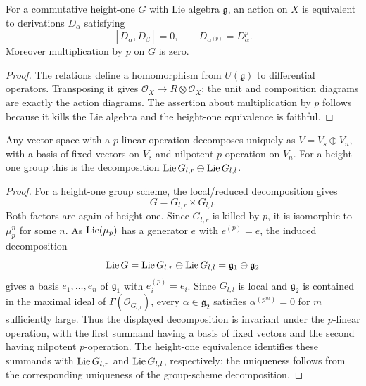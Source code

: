 \begin{corollary}
\label{mumford-cor-height-one-actions}
For a commutative height-one $G$ with Lie algebra $\mathfrak g$, an action on
$X$ is equivalent to derivations $D_\alpha$ satisfying
\[
[D_\alpha,D_\beta]=0,\qquad D_{\alpha^{(p)}}=D_\alpha^p.
\]
Moreover multiplication by $p$ on $G$ is zero.
\end{corollary}
\begin{proof}
The relations define a homomorphism from $U(\mathfrak g)$ to differential
operators. Transposing it gives
$\mathcal O_X\to R\otimes\mathcal O_X$; the unit and composition diagrams
are exactly the action diagrams. The assertion about multiplication by $p$
follows because it kills the Lie algebra and the height-one equivalence is
faithful.
\end{proof}

\begin{corollary}
\label{mumford-cor-p-lie-semisimple-nilpotent}
Any vector space with a $p$-linear operation decomposes uniquely as
$V=V_s\oplus V_n$, with a basis of fixed vectors on $V_s$ and nilpotent
$p$-operation on $V_n$. For a height-one group this is the decomposition
$\operatorname{Lie} G_{l,r}\oplus\operatorname{Lie} G_{l,l}$.
\end{corollary}
\begin{proof}
For a height-one group scheme, the local/reduced decomposition gives
\[
G=G_{l,r}\times G_{l,l}.
\]
Both factors are again of height one. Since $G_{l,r}$ is killed by $p$, it
is isomorphic to $\mu_p^n$ for some $n$. As $\operatorname{Lie}(\mu_p)$ has a generator
$e$ with $e^{(p)}=e$, the induced decomposition
\[
\operatorname{Lie} G=\operatorname{Lie} G_{l,r}\oplus\operatorname{Lie} G_{l,l}=\mathfrak g_1\oplus\mathfrak g_2
\]
gives a basis $e_1,\ldots,e_n$ of $\mathfrak g_1$ with
$e_i^{(p)}=e_i$. Since $G_{l,l}$ is local and $\mathfrak g_2$ is contained
in the maximal ideal of $\Gamma(\mathcal O_{G_{l,l}})$, every
$\alpha\in\mathfrak g_2$ satisfies $\alpha^{(p^m)}=0$ for $m$ sufficiently
large. Thus the displayed decomposition is invariant under the $p$-linear
operation, with the first summand having a basis of fixed vectors and the
second having nilpotent $p$-operation. The height-one equivalence identifies
these summands with $\operatorname{Lie} G_{l,r}$ and $\operatorname{Lie} G_{l,l}$, respectively; the
uniqueness follows from the corresponding uniqueness of the group-scheme
decomposition.
\end{proof}

